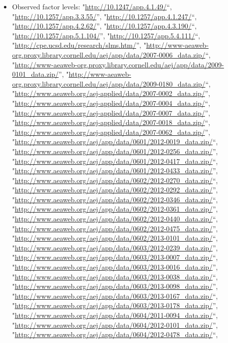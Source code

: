 \documentclass[]{article}
\providecommand{\tightlist}{%
  \setlength{\itemsep}{0pt}\setlength{\parskip}{0pt}}
\begin{document}
\begin{itemize}
\tightlist
\item
  Observed factor levels: "\url{http://10.1247/app.4.1.49/}``,
  "\url{http://10.1257/app.3.3.55/}'',
  "\url{http://10.1257/app.4.1.247/}``,
  "\url{http://10.1257/app.4.2.62/}'',
  "\url{http://10.1257/app.4.3.190/}``,
  "\url{http://10.1257/app.5.1.104/}'',
  "\url{http://10.1257/app.5.4.111/}``,
  "\url{http://cpe.ucsd.edu/research/slms.htm/}'',
  "\url{http://www-aeaweb-org.proxy.library.cornell.edu/aej/app/data/2007-0006_data.zip/}``,
  "\url{http://www-aeaweb-org.proxy.library.cornell.edu/aej/app/data/2009-0101_data.zip/}'',
  "\url{http://www-aeaweb-org.proxy.library.cornell.edu/aej/app/data/2009-0180_data.zip/}``,
  "\url{http://www.aeaweb.org/aej-applied/data/2007-0002_data.zip/}'',
  "\url{http://www.aeaweb.org/aej-applied/data/2007-0004_data.zip/}``,
  "\url{http://www.aeaweb.org/aej-applied/data/2007-0007_data.zip/}'',
  "\url{http://www.aeaweb.org/aej-applied/data/2007-0018_data.zip/}``,
  "\url{http://www.aeaweb.org/aej-applied/data/2007-0062_data.zip/}'',
  "\url{http://www.aeaweb.org/aej/app/data/0601/2012-0019_data.zip/}``,
  "\url{http://www.aeaweb.org/aej/app/data/0601/2012-0256_data.zip/}'',
  "\url{http://www.aeaweb.org/aej/app/data/0601/2012-0417_data.zip/}``,
  "\url{http://www.aeaweb.org/aej/app/data/0601/2012-0433_data.zip/}'',
  "\url{http://www.aeaweb.org/aej/app/data/0602/2012-0270_data.zip/}``,
  "\url{http://www.aeaweb.org/aej/app/data/0602/2012-0292_data.zip/}'',
  "\url{http://www.aeaweb.org/aej/app/data/0602/2012-0346_data.zip/}``,
  "\url{http://www.aeaweb.org/aej/app/data/0602/2012-0361_data.zip/}'',
  "\url{http://www.aeaweb.org/aej/app/data/0602/2012-0440_data.zip/}``,
  "\url{http://www.aeaweb.org/aej/app/data/0602/2012-0475_data.zip/}'',
  "\url{http://www.aeaweb.org/aej/app/data/0602/2013-0101_data.zip/}``,
  "\url{http://www.aeaweb.org/aej/app/data/0603/2012-0239_data.zip/}'',
  "\url{http://www.aeaweb.org/aej/app/data/0603/2013-0007_data.zip/}``,
  "\url{http://www.aeaweb.org/aej/app/data/0603/2013-0016_data.zip/}'',
  "\url{http://www.aeaweb.org/aej/app/data/0603/2013-0038_data.zip/}``,
  "\url{http://www.aeaweb.org/aej/app/data/0603/2013-0098_data.zip/}'',
  "\url{http://www.aeaweb.org/aej/app/data/0603/2013-0167_data.zip/}``,
  "\url{http://www.aeaweb.org/aej/app/data/0603/2013-0178_data.zip/}'',
  "\url{http://www.aeaweb.org/aej/app/data/0604/2011-0094_data.zip/}``,
  "\url{http://www.aeaweb.org/aej/app/data/0604/2012-0101_data.zip/}'',
  "\url{http://www.aeaweb.org/aej/app/data/0604/2012-0478_data.zip/}``,

\end{itemize}
\end{document}
